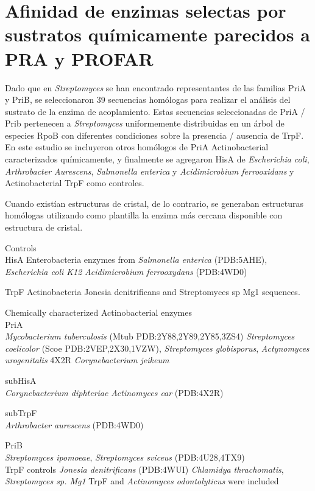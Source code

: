 \documentclass[12pt,twoside]{reedthesis}
\begin{document}
  \section{Afinidad de enzimas selectas por sustratos químicamente
  parecidos a PRA y
  PROFAR}\label{afinidad-de-enzimas-selectas-por-sustratos-quimicamente-parecidos-a-pra-y-profar}
  
  Dado que en \emph{Streptomyces} se han encontrado representantes de las
  familias PriA y PriB, se seleccionaron 39 secuencias homólogas para
  realizar el análisis del sustrato de la enzima de acoplamiento. Estas
  secuencias seleccionadas de PriA / Prib pertenecen a \emph{Streptomyces}
  uniformemente distribuidas en un árbol de especies RpoB con diferentes
  condiciones sobre la presencia / ausencia de TrpF. En este estudio se
  incluyeron otros homólogos de PriA Actinobacterial caracterizados
  químicamente, y finalmente se agregaron HisA de \emph{Escherichia coli},
  \emph{Arthrobacter Aurescens}, \emph{Salmonella enterica} y
  \emph{Acidimicrobium ferrooxidans} y Actinobacterial TrpF como
  controles.
  
  Cuando existían estructuras de cristal, de lo contrario, se generaban
  estructuras homólogas utilizando como plantilla la enzima más cercana
  disponible con estructura de cristal.
  
  Controls\\
  HisA Enterobacteria enzymes from \emph{Salmonella enterica} (PDB:5AHE),
  \emph{Escherichia coli K12} \emph{Acidimicrobium ferrooxydans}
  (PDB:4WD0)
  
  TrpF Actinobacteria Jonesia denitrificans and Streptomyces sp Mg1
  sequences.
  
  Chemically characterized Actinobacterial enzymes\\
  PriA\\
  \emph{Mycobacterium tuberculosis} (Mtub PDB:2Y88,2Y89,2Y85,3ZS4)
  \emph{Streptomyces coelicolor} (Scoe PDB:2VEP,2X30,1VZW),
  \emph{Streptomyces globisporus}, \emph{Actynomyces urogenitalis} 4X2R
  \emph{Corynebacterium jeikeum}
  
  subHisA\\
  \emph{Corynebacterium diphteriae} \emph{Actinomyces car} (PDB:4X2R)
  
  subTrpF\\
  \emph{Arthrobacter aurescens} (PDB:4WD0)
  
  PriB\\
  \emph{Streptomyces ipomoeae}, \emph{Streptomyces sviceus}
  (PDB:4U28,4TX9)\\
  TrpF controls \emph{Jonesia denitrificans} (PDB:4WUI) \emph{Chlamidya
  thrachomatis}, \emph{Streptomyces sp. Mg1} TrpF and \emph{Actinomyces
  odontolyticus} were included
  
\end{document}
